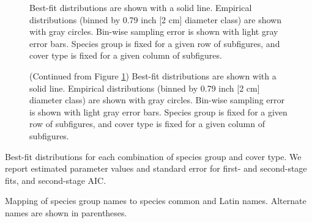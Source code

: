 \documentclass{article}
\begin{document}
\clearpage

\begin{figure}[h!]
  \caption{Best-fit distributions are shown with a solid
    line. Empirical distributions (binned by 0.79 inch [2 cm] diameter class) are shown with gray circles. Bin-wise sampling error is shown with light gray error bars. Species group is fixed for a given row of subfigures, and cover type is fixed for a given column of subfigures.}
  \label{fig:results1}
\end{figure}

\begin{figure}[h!]
  \caption{(Continued from Figure \ref{fig:results1}) Best-fit distributions are shown with a solid
    line. Empirical distributions (binned by 0.79 inch [2 cm] diameter class) are shown with gray circles. Bin-wise sampling error is shown with light gray error bars. Species group is fixed for a given row of
    subfigures, and cover type is fixed for a given column of subfigures.}
  \label{fig:results2}
\end{figure}



\begin{table}[h!]
\caption{Best-fit distributions for each combination of species group
  and cover type. We report estimated parameter values and standard
  error for first- and second-stage fits, and second-stage AIC.}
\label{tab:results}
\end{table}

\begin{table}[h!]
\caption{Mapping of species group names to species common and Latin names. Alternate names are shown in parentheses.}
\vspace{1em}
\label{tab:a_speciesgroups}
\end{table}
\end{document}
